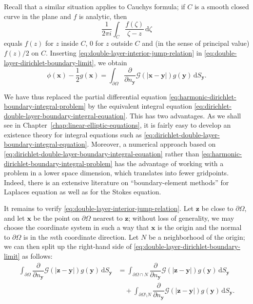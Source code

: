 Recall that a similar situation applies to Cauchy\textquotesingle s formula; if $C$ is a smooth closed curve in the plane and $f$ is analytic, then
\begin{equation}\label{eq:cauchy-integral-boundary-principal-value-analogue}
\dfrac1{2\pi i}\int_C\dfrac{f(\zeta)}{\zeta-z}\,\mathrm{d}\zeta
\end{equation}
equals $f(z)$ for $z$ inside $C$, 0 for $z$ outside $C$ and (in the sense of principal value) $f(z)/2$ on $C$. Inserting \eqref{eq:double-layer-interior-jump-relation} in \eqref{eq:double-layer-dirichlet-boundary-limit}, we obtain
\begin{equation}\label{eq:dirichlet-double-layer-boundary-integral-equation}
\phi(\bm{x})-\dfrac12g(\bm{x})=\int_{\partial\Omega}\dfrac{\partial}{\partial n_{\bm{y}}}\mathcal{G}(|\bm{x}-\bm{y}|)g(\bm{y})\,\mathrm{d}S_{\bm{y}}.
\end{equation}


We have thus replaced the partial differential equation \eqref{eq:harmonic-dirichlet-boundary-integral-problem} by the equivalent integral equation \eqref{eq:dirichlet-double-layer-boundary-integral-equation}. This has two advantages. As we shall see in Chapter~\ref{chap:linear-elliptic-equations}, it is fairly easy to develop an existence theory for integral equations such as \eqref{eq:dirichlet-double-layer-boundary-integral-equation}. Moreover, a numerical approach based on \eqref{eq:dirichlet-double-layer-boundary-integral-equation} rather than \eqref{eq:harmonic-dirichlet-boundary-integral-problem} has the advantage of working with a problem in a lower space dimension, which translates into fewer gridpoints. Indeed, there is an extensive literature on ``boundary-element methods'' for Laplace\textquotesingle s equation as well as for the Stokes equation.

It remains to verify \eqref{eq:double-layer-interior-jump-relation}. Let $\bm{z}$ be close to $\partial\Omega$, and let $\bm{x}$ be the point on $\partial\Omega$ nearest to $\bm{z}$; without loss of generality, we may choose the coordinate system in such a way that $\bm{x}$ is the origin and the normal to $\partial\Omega$ is in the $m$th coordinate direction. Let $N$ be a neighborhood of the origin; we can then split up the right-hand side of \eqref{eq:double-layer-dirichlet-boundary-limit} as follows:
\begin{equation}\label{eq:double-layer-local-distant-splitting}
\begin{aligned}
\int_{\partial\Omega}\dfrac{\partial}{\partial n_{\bm{y}}}\mathcal{G}(|\bm{z}-\bm{y}|)g(\bm{y})\,\mathrm{d}S_{\bm{y}}
&=\int_{\partial\Omega\cap N}\dfrac{\partial}{\partial n_{\bm{y}}}\mathcal{G}(|\bm{z}-\bm{y}|)g(\bm{y})\,\mathrm{d}S_{\bm{y}}\\
&\quad+\int_{\partial\Omega\setminus N}\dfrac{\partial}{\partial n_{\bm{y}}}\mathcal{G}(|\bm{z}-\bm{y}|)g(\bm{y})\,\mathrm{d}S_{\bm{y}}.
\end{aligned}
\end{equation}


